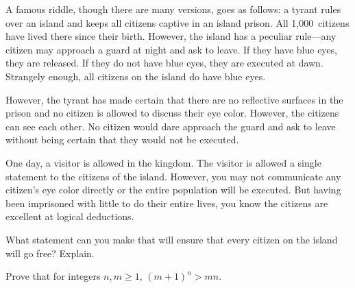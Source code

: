 \documentclass[11pt,letterpaper]{article}
\begin{document}
\newpage





 A famous riddle, though there are many versions, goes as follows: a tyrant rules over an island and keeps all citizens captive in an island prison. All 1,000~citizens have lived there since their birth. However, the island has a peculiar rule---any citizen may approach a guard at night and ask to leave. If they have blue eyes, they are released. If they do not have blue eyes, they are executed at dawn. Strangely enough, all citizens on the island do have blue eyes. 

However, the tyrant has made certain that there are no reflective surfaces in the prison and no citizen is allowed to discuss their eye color. However, the citizens can see each other. No citizen would dare approach the guard and ask to leave without being certain that they would not be executed. 

One day, a visitor is allowed in the kingdom. The visitor is allowed a single statement to the citizens of the island. However, you may not communicate any citizen's eye color directly or the entire population will be executed. But having been imprisoned with little to do their entire lives, you know the citizens are excellent at logical deductions. 

What statement can you make that will ensure that every citizen on the island will go free? Explain. 





\newpage





 Prove that for integers $n, m \geq 1$, $(m + 1)^n > mn$. 
\end{document}
